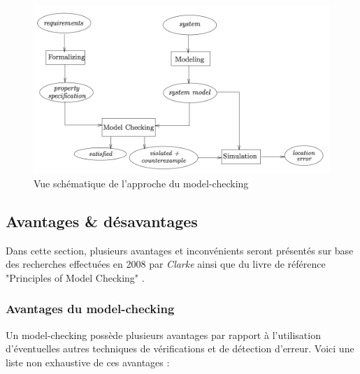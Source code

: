\documentclass[runningheads,a4paper,10pt]{llncs}
\begin{document}
\begin{figure}
  \centering
   \includegraphics[scale=0.7]{figures/schematic-view.png}
   \caption[Caption for LOF]{Vue schématique de l'approche du model-checking\protect\footnotemark}
   \label{fig:schematic-view}
\end{figure}


\subsection{Avantages \& désavantages}

Dans cette section, plusieurs avantages et inconvénients seront présentés sur base des recherches effectuées en 2008 par \textit{Clarke} \cite{Birth-MC} ainsi que du livre de référence "Principles of Model Checking" \cite{RefBook}.

\subsubsection{Avantages du model-checking}

Un model-checking possède plusieurs avantages par rapport à l'utilisation d'éventuelles autres techniques de vérifications et de détection d'erreur. Voici une liste non exhaustive de ces avantages : 
\end{document}
